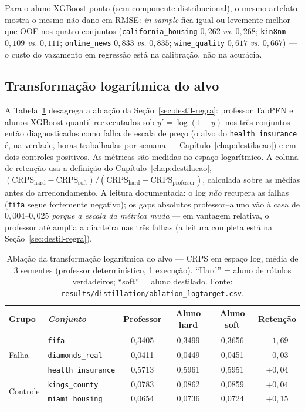 Para o aluno XGBoost-ponto (sem componente distribucional), o mesmo
artefato mostra o mesmo não-dano em RMSE: \emph{in-sample} fica igual
ou levemente melhor que OOF nos quatro conjuntos
(\texttt{california\_\allowbreak housing} $0{,}262$ \emph{vs.} $0{,}268$;
\texttt{kin8nm} $0{,}109$ \emph{vs.} $0{,}111$; \texttt{online\_news}
$0{,}833$ \emph{vs.} $0{,}835$; \texttt{wine\_quality} $0{,}617$
\emph{vs.} $0{,}667$) --- o custo do vazamento em regressão está na
calibração, não na acurácia.

\subsection{Transformação logarítmica do alvo}

A Tabela~\ref{tab:app-abl-log} desagrega a ablação da
Seção~\ref{sec:destil-regra}: professor TabPFN e alunos XGBoost-quantil
reexecutados sob $y' = \log(1+y)$ nos três conjuntos então
diagnosticados como falha de escala de preço (o alvo do
\texttt{health\_insurance} é, na verdade, horas trabalhadas por
semana --- Capítulo~\ref{chap:destilacao}) e em
dois controles positivos. As
métricas são medidas no espaço logarítmico. A coluna de retenção usa a
definição do Capítulo~\ref{chap:destilacao},
$(\mathrm{CRPS}_{\text{hard}} - \mathrm{CRPS}_{\text{soft}}) /
(\mathrm{CRPS}_{\text{hard}} - \mathrm{CRPS}_{\text{professor}})$,
calculada sobre as médias antes do arredondamento. A leitura
documentada: o log
\emph{não} recupera as falhas (\texttt{fifa} segue fortemente
negativo); os gaps absolutos professor--aluno vão à casa de
$0{,}004$--$0{,}025$ \emph{porque a escala da métrica muda} --- em
vantagem relativa, o professor até amplia a dianteira nas três
falhas (a leitura completa está na
Seção~\ref{sec:destil-regra}).

\begin{table}[htbp]
\centering\small
\caption[Ablação log-target --- desagregada]{Ablação da transformação
logarítmica do alvo --- CRPS em espaço log, média de 3 sementes
(professor determinístico, 1 execução). ``Hard'' = aluno de rótulos
verdadeiros; ``soft'' = aluno destilado. Fonte:
\texttt{results/\allowbreak distillation/\allowbreak ablation\_\allowbreak logtarget.\allowbreak csv}.}
\label{tab:app-abl-log}
\begin{tabular}{llcccc}
\toprule
Grupo & \emph{Conjunto} & Professor & Aluno hard & Aluno soft &
Retenção \\
\midrule
\multirow{3}{*}{Falha}
 & \texttt{fifa}              & 0{,}3405 & 0{,}3499 & 0{,}3656 & $-1{,}69$ \\
 & \texttt{diamonds\_real}    & 0{,}0411 & 0{,}0449 & 0{,}0451 & $-0{,}03$ \\
 & \texttt{health\_\allowbreak insurance} & 0{,}5713 & 0{,}5961 & 0{,}5951 & $+0{,}04$ \\
\midrule
\multirow{2}{*}{Controle}
 & \texttt{kings\_county}     & 0{,}0783 & 0{,}0862 & 0{,}0859 & $+0{,}04$ \\
 & \texttt{miami\_housing}    & 0{,}0654 & 0{,}0736 & 0{,}0724 & $+0{,}15$ \\
\bottomrule
\end{tabular}
\end{table}

